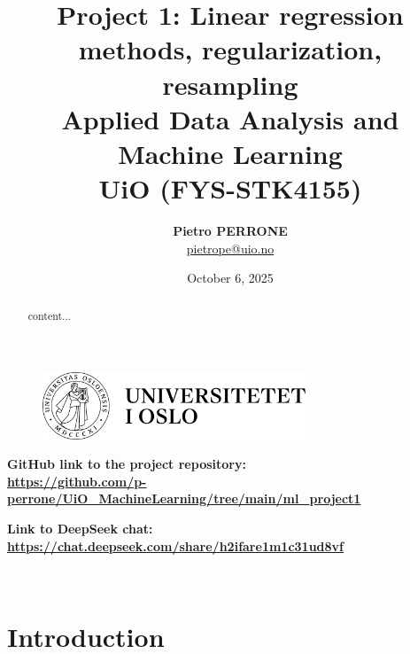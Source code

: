 \documentclass[11pt,a4paper,twocolumn]{article}
\title{\bfseries Project 1: Linear regression methods, regularization, resampling\\
	\normalfont Applied Data Analysis and Machine Learning
	\\ UiO (FYS-STK4155)}
\author{
	\textbf{Pietro PERRONE}\\
	\href{pietrope@uio.no}{pietrope@uio.no} \\
}
\date{October 6, 2025}
\begin{document}
	
	\begin{titlepage}
		
		\begin{figure}
			\centering
			\includegraphics[width=0.7\textwidth]{uio.png}
		\end{figure}
		
		\maketitle
		
		\centering
		
		
		\textbf{GitHub link to the project repository:\\
			\url{https://github.com/p-perrone/UiO_MachineLearning/tree/main/ml_project1}}
		
		\textbf{Link to DeepSeek chat:\\
			\url{https://chat.deepseek.com/share/h2ifare1m1c31ud8vf}}
		
		\begin{abstract}
			content...
		\end{abstract}
		
	\end{titlepage}
	\onecolumn
	
	\tableofcontents
	
	\twocolumn\
	
	\section{Introduction}
	
\end{document}
